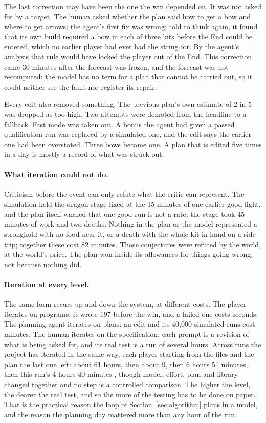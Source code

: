 \documentclass[11pt,a4paper]{article}
\begin{document}
The last correction may have been the one the win depended on. It was not asked for by a target. The human asked whether the plan said how to get a bow and where to get arrows; the agent's first fix was wrong; told to think again, it found that its own build required a bow in each of three kits before the End could be entered, which no earlier player had ever had the string for. By the agent's analysis that rule would have locked the player out of the End. This correction came 30 minutes after the forecast was frozen, and the forecast was not recomputed: the model has no term for a plan that cannot be carried out, so it could neither see the fault nor register its repair.

Every edit also removed something. The previous plan's own estimate of 2 in 5 was dropped as too high. Two attempts were demoted from the headline to a fallback. Fast mode was taken out. A bonus the agent had given a passed qualification run was replaced by a simulated one, and the edit says the earlier one had been overstated. Three bows became one. A plan that is edited five times in a day is mostly a record of what was struck out.

\paragraph{What iteration could not do.} Criticism before the event can only refute what the critic can represent. The simulation held the dragon stage fixed at the 15 minutes of one earlier good fight, and the plan itself warned that one good run is not a rate; the stage took 45 minutes of work and two deaths. Nothing in the plan or the model represented a stronghold with no food near it, or a death with the whole kit in hand on a side trip; together these cost 82 minutes. Those conjectures were refuted by the world, at the world's price. The plan won inside its allowances for things going wrong, not because nothing did.

\paragraph{Iteration at every level.} The same form recurs up and down the system, at different costs. The player iterates on programs: it wrote 197 before the win, and a failed one costs seconds. The planning agent iterates on plans: an edit and its 40,000 simulated runs cost minutes. The human iterates on the specification: each prompt is a revision of what is being asked for, and its real test is a run of several hours. Across runs the project has iterated in the same way, each player starting from the files and the plan the last one left: about 61 hours, then about 9, then 6 hours 51 minutes, then this run's 4 hours 40 minutes \citep{batsuk2026fourth,batsuk2026fifth}, though model, effort, plan and library changed together and no step is a controlled comparison. The higher the level, the dearer the real test, and so the more of the testing has to be done on paper. That is the practical reason the loop of Section~\ref{sec:algorithm} plans in a model, and the reason the planning day mattered more than any hour of the run.
\end{document}
